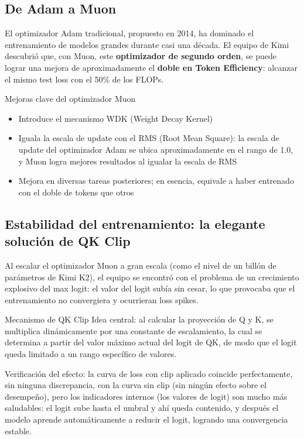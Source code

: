 \documentclass[a4paper]{article}
\begin{document}
\subsection{De Adam a Muon}

El optimizador Adam tradicional, propuesto en 2014, ha dominado el entrenamiento de modelos grandes durante casi una década. El equipo de Kimi descubrió que, con Muon, este \textbf{optimizador de segundo orden}, se puede lograr una mejora de aproximadamente el \textbf{doble en Token Efficiency}: alcanzar el mismo test loss con el 50\% de los FLOPs.

\begin{importantbox}{Mejoras clave del optimizador Muon}
\begin{itemize}
\item Introduce el mecanismo WDK (Weight Decay Kernel)
\item Iguala la escala de update con el RMS (Root Mean Square): la escala de update del optimizador Adam se ubica aproximadamente en el rango de 1.0, y Muon logra mejores resultados al igualar la escala de RMS
\item Mejora en diversas tareas posteriores; en esencia, equivale a haber entrenado con el doble de tokens que otros
\end{itemize}
\end{importantbox}

\subsection{Estabilidad del entrenamiento: la elegante solución de QK Clip}

Al escalar el optimizador Muon a gran escala (como el nivel de un billón de parámetros de Kimi K2), el equipo se encontró con el problema de un crecimiento explosivo del max logit: el valor del logit subía sin cesar, lo que provocaba que el entrenamiento no convergiera y ocurrieran loss spikes.

\begin{knowledgebox}{Mecanismo de QK Clip}
Idea central: al calcular la proyección de Q y K, se multiplica dinámicamente por una constante de escalamiento, la cual se determina a partir del valor máximo actual del logit de QK, de modo que el logit queda limitado a un rango específico de valores.

Verificación del efecto: la curva de loss con clip aplicado coincide perfectamente, sin ninguna discrepancia, con la curva sin clip (sin ningún efecto sobre el desempeño), pero los indicadores internos (los valores de logit) son mucho más saludables: el logit sube hasta el umbral y ahí queda contenido, y después el modelo aprende automáticamente a reducir el logit, logrando una convergencia estable.
\end{knowledgebox}
\end{document}
